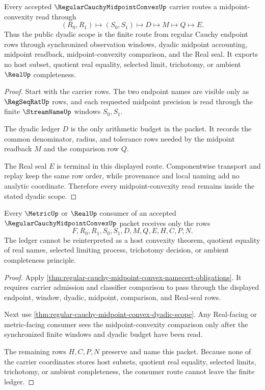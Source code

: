\begin{theorem}
\label{thm:regular-cauchy-midpoint-convex-dyadic-scope}
Every accepted $\RegularCauchyMidpointConvexUp$ carrier routes a midpoint-convexity read through
$$
(R_0,R_1)\longmapsto(S_0,S_1)\longmapsto D\longmapsto M\longmapsto Q\longmapsto E.
$$
Thus the public dyadic scope is the finite route from regular Cauchy endpoint rows through synchronized observation windows, dyadic midpoint accounting, midpoint readback, midpoint-convexity comparison, and the Real seal. It exports no host subset, quotient real equality, selected limit, trichotomy, or ambient $\RealUp$ completeness.
\end{theorem}
\begin{proof}
Start with the carrier rows. The two endpoint names are visible only as $\RegSeqRatUp$ rows, and each requested midpoint precision is read through the finite $\StreamNameUp$ windows $S_0,S_1$.

The dyadic ledger $D$ is the only arithmetic budget in the packet. It records the common denominator, radius, and tolerance rows needed by the midpoint readback $M$ and the comparison row $Q$.

The Real seal $E$ is terminal in this displayed route. Componentwise transport and replay keep the same row order, while provenance and local naming add no analytic coordinate. Therefore every midpoint-convexity read remains inside the stated dyadic scope.
\end{proof}

\begin{theorem}
\label{thm:regular-cauchy-midpoint-convex-ledger-nonescape}
Every $\MetricUp$ or $\RealUp$ consumer of an accepted $\RegularCauchyMidpointConvexUp$ packet receives only the rows
$$
F,R_0,R_1,S_0,S_1,D,M,Q,E,H,C,P,N.
$$
The ledger cannot be reinterpreted as a host convexity theorem, quotient equality of real names, selected limiting process, trichotomy decision, or ambient completeness principle.
\end{theorem}
\begin{proof}
Apply \autoref{thm:regular-cauchy-midpoint-convex-namecert-obligations}. It requires carrier admission and classifier comparison to pass through the displayed endpoint, window, dyadic, midpoint, comparison, and Real-seal rows.

Next use \autoref{thm:regular-cauchy-midpoint-convex-dyadic-scope}. Any Real-facing or metric-facing consumer sees the midpoint-convexity comparison only after the synchronized finite windows and dyadic budget have been read.

The remaining rows $H,C,P,N$ preserve and name this packet. Because none of the carrier coordinates stores host subsets, quotient real equality, selected limits, trichotomy, or ambient completeness, the consumer route cannot leave the finite ledger.
\end{proof}

